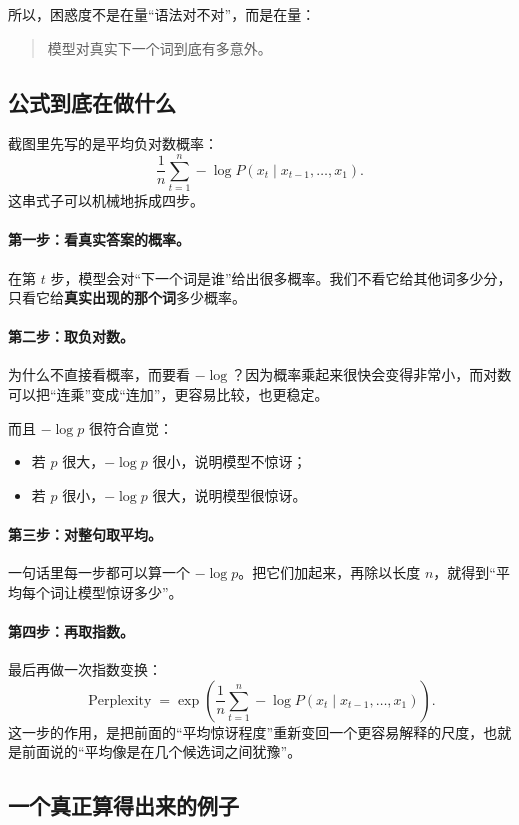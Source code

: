 \documentclass[12pt,a4paper]{ctexart}
\begin{document}
所以，困惑度不是在量“语法对不对”，而是在量：
\begin{quote}
模型对真实下一个词到底有多意外。
\end{quote}

\subsection{公式到底在做什么}

截图里先写的是平均负对数概率：
\[
\frac{1}{n}\sum_{t=1}^{n} -\log P(x_t \mid x_{t-1}, \ldots, x_1).
\]
这串式子可以机械地拆成四步。

\paragraph{第一步：看真实答案的概率。}
在第 \(t\) 步，模型会对“下一个词是谁”给出很多概率。我们不看它给其他词多少分，只看它给\textbf{真实出现的那个词}多少概率。

\paragraph{第二步：取负对数。}
为什么不直接看概率，而要看 \(-\log\)？因为概率乘起来很快会变得非常小，而对数可以把“连乘”变成“连加”，更容易比较，也更稳定。

而且 \(-\log p\) 很符合直觉：
\begin{itemize}
  \item 若 \(p\) 很大，\(-\log p\) 很小，说明模型不惊讶；
  \item 若 \(p\) 很小，\(-\log p\) 很大，说明模型很惊讶。
\end{itemize}

\paragraph{第三步：对整句取平均。}
一句话里每一步都可以算一个 \(-\log p\)。把它们加起来，再除以长度 \(n\)，就得到“平均每个词让模型惊讶多少”。

\paragraph{第四步：再取指数。}
最后再做一次指数变换：
\[
\operatorname{Perplexity}
=
\exp\!\left(
\frac{1}{n}\sum_{t=1}^{n} -\log P(x_t \mid x_{t-1}, \ldots, x_1)
\right).
\]
这一步的作用，是把前面的“平均惊讶程度”重新变回一个更容易解释的尺度，也就是前面说的“平均像是在几个候选词之间犹豫”。

\subsection{一个真正算得出来的例子}
\end{document}
